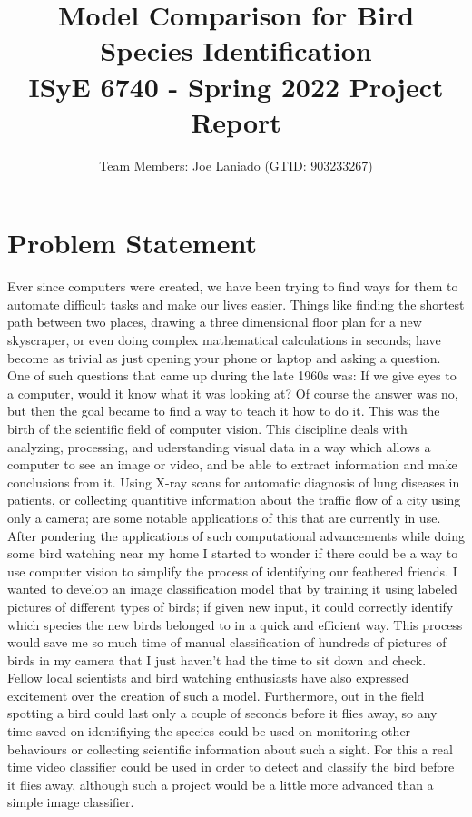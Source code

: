 \documentclass[11pt]{article}
\title{%
Model Comparison for Bird Species Identification\\
  \large ISyE 6740 - Spring 2022 Project Report}
\author{Team Members: Joe Laniado (GTID: 903233267)}
\begin{document}
\begin{singlespace}
\begin{titlepage}
\maketitle
\end{titlepage}
\tableofcontents
\clearpage

\section{Problem Statement}
Ever since computers were created, we have been trying to find ways for them to automate difficult tasks and make our lives easier. Things like finding the shortest path between two places, drawing a three dimensional floor plan for a new skyscraper, or even doing complex mathematical calculations in seconds; have become as trivial as just opening your phone or laptop and asking a question. One of such questions that came up during the late 1960s was: If we give eyes to a computer, would it know what it was looking at? 
Of course the answer was no, but then the goal became to find a way to teach it how to do it. This was the birth of the scientific field of computer vision. This discipline deals with analyzing, processing, and uderstanding visual data in a way which allows a computer to see an image or video, and be able to extract information and make conclusions from it. Using X-ray scans for automatic diagnosis of lung diseases in patients, or collecting quantitive information about the traffic flow of a city using only a camera; are some notable applications of this that are currently in use. \\

After pondering the applications of such computational advancements while doing some bird watching near my home I started to wonder if there could be a way to use computer vision to simplify the process of identifying our feathered friends. I wanted to develop an image classification model that by training it using labeled pictures of different types of birds; if given new input, it could correctly identify which species the new birds belonged to in a quick and efficient way. This process would save me so much time of manual classification of hundreds of pictures of birds in my camera that I just haven't had the time to sit down and check. Fellow local scientists and bird watching enthusiasts have also expressed excitement over the creation of such a model. Furthermore, out in the field spotting a bird could last only a couple of seconds before it flies away, so any time saved on identifiying the species could be used on monitoring other behaviours or collecting scientific information about such a sight. For this a real time video classifier could be used in order to detect and classify the bird before it flies away, although such a project would be a little more advanced than a simple image classifier. \\


\end{singlespace}
\end{document}
